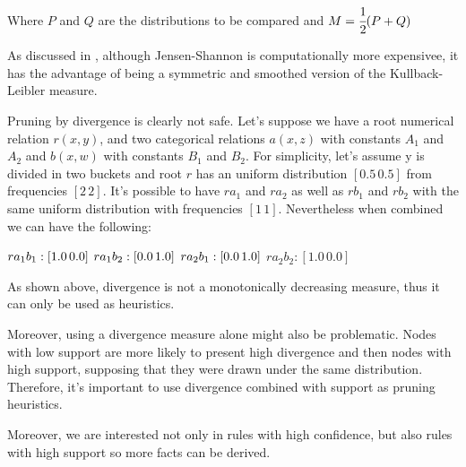 Where $P$ and $Q$ are the distributions to be compared and $M=\cfrac{1}{2}(P+Q)$

As discussed in \cite{17795}, although Jensen-Shannon is computationally more expensivee, it has the advantage of being a symmetric and smoothed version of the Kullback-Leibler measure.

Pruning by divergence is clearly not safe. Let's suppose we have a root numerical relation $r(x,y)$, and two categorical relations $a(x,z)$ with constants $A_1$ and $A_2$ and $b(x,w)$ with constants $B_1$ and $B_2$. For simplicity, let's assume y is divided in two buckets and root $r$ has an uniform distribution $[0.5 \, 0.5]$ from frequencies $[2 \, 2]$. It's possible to have $r a_1$ and $r a_2$ as well as $r b_1$ and $r b_2$ with the same uniform distribution with frequencies $[1 \, 1]$. Nevertheless when combined we can have the following:

$r a_1 b_1 : [1.0 \, 0.0] \\$
$r a_1 b_2 : [0.0 \, 1.0] \\$
$r a_2 b_1 : [0.0 \, 1.0] \\$
$r a_2 b_2 : [1.0 \, 0.0]$

As shown above, divergence is not a monotonically decreasing measure, thus it can only be used as heuristics.


Moreover, using a divergence measure alone might also be problematic. Nodes with low support are more likely to present high divergence and then nodes with high support, supposing that they were drawn under the same distribution. Therefore, it's important to use divergence combined with support as pruning heuristics.

Moreover, we are interested not only in rules with high confidence, but also rules with high support so more facts can be derived.





